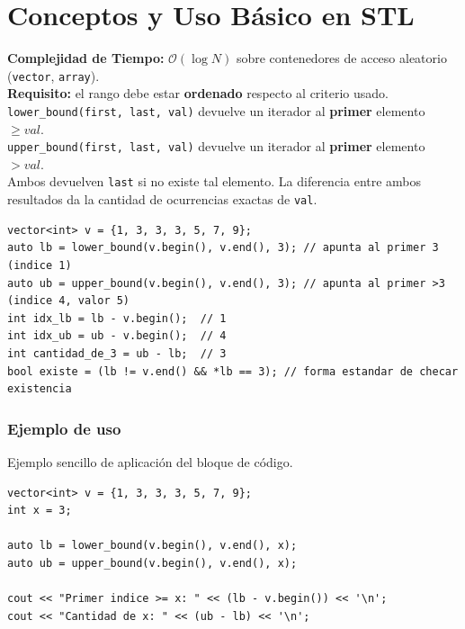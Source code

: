 \documentclass[10pt,twocolumn,letterpaper]{report}
\begin{document}
\section{Conceptos y Uso Básico en STL}
\textbf{Complejidad de Tiempo:} $\mathcal{O}(\log N)$ sobre contenedores de acceso aleatorio (\texttt{vector}, \texttt{array}). \\
\textbf{Requisito:} el rango debe estar \textbf{ordenado} respecto al criterio usado. \\
\texttt{lower\_bound(first, last, val)} devuelve un iterador al \textbf{primer} elemento $\geq val$. \\
\texttt{upper\_bound(first, last, val)} devuelve un iterador al \textbf{primer} elemento $> val$. \\
Ambos devuelven \texttt{last} si no existe tal elemento. La diferencia entre ambos resultados da la cantidad de ocurrencias exactas de \texttt{val}.
\begin{lstlisting}
vector<int> v = {1, 3, 3, 3, 5, 7, 9};
auto lb = lower_bound(v.begin(), v.end(), 3); // apunta al primer 3 (indice 1)
auto ub = upper_bound(v.begin(), v.end(), 3); // apunta al primer >3 (indice 4, valor 5)
int idx_lb = lb - v.begin();  // 1
int idx_ub = ub - v.begin();  // 4
int cantidad_de_3 = ub - lb;  // 3
bool existe = (lb != v.end() && *lb == 3); // forma estandar de checar existencia
\end{lstlisting}
\subsubsection*{Ejemplo de uso}
Ejemplo sencillo de aplicación del bloque de código.
\begin{lstlisting}
vector<int> v = {1, 3, 3, 3, 5, 7, 9};
int x = 3;

auto lb = lower_bound(v.begin(), v.end(), x);
auto ub = upper_bound(v.begin(), v.end(), x);

cout << "Primer indice >= x: " << (lb - v.begin()) << '\n';
cout << "Cantidad de x: " << (ub - lb) << '\n';
\end{lstlisting}
\end{document}
